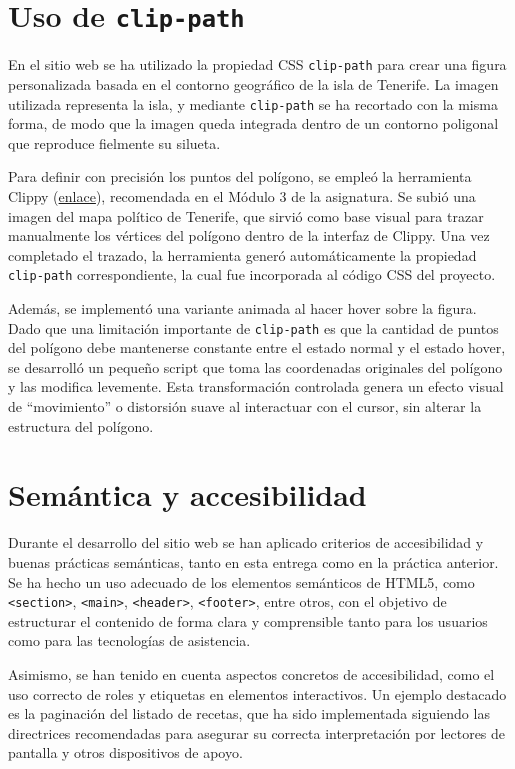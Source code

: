 \documentclass{article}
\begin{document}
\section{Uso de \texttt{clip-path}}\label{sec:uso-de-clip-path}

En el sitio web se ha utilizado la propiedad CSS \texttt{clip-path} para crear una figura personalizada basada en el contorno geográfico de la isla de Tenerife. La imagen utilizada representa la isla, y mediante \texttt{clip-path} se ha recortado con la misma forma, de modo que la imagen queda integrada dentro de un contorno poligonal que reproduce fielmente su silueta.

Para definir con precisión los puntos del polígono, se empleó la herramienta Clippy (\href{https://bennettfeely.com/clippy/}{enlace}), recomendada en el Módulo 3 de la asignatura. Se subió una imagen del mapa político de Tenerife, que sirvió como base visual para trazar manualmente los vértices del polígono dentro de la interfaz de Clippy. Una vez completado el trazado, la herramienta generó automáticamente la propiedad \texttt{clip-path} correspondiente, la cual fue incorporada al código CSS del proyecto.

Además, se implementó una variante animada al hacer hover sobre la figura. Dado que una limitación importante de \texttt{clip-path} es que la cantidad de puntos del polígono debe mantenerse constante entre el estado normal y el estado hover, se desarrolló un pequeño script que toma las coordenadas originales del polígono y las modifica levemente. Esta transformación controlada genera un efecto visual de ``movimiento'' o distorsión suave al interactuar con el cursor, sin alterar la estructura del polígono.

\section{Semántica y accesibilidad}\label{sec:semantica-y-accesibilidad}

Durante el desarrollo del sitio web se han aplicado criterios de accesibilidad y buenas prácticas semánticas, tanto en esta entrega como en la práctica anterior. Se ha hecho un uso adecuado de los elementos semánticos de HTML5, como \texttt{<section>}, \texttt{<main>}, \texttt{<header>}, \texttt{<footer>}, entre otros, con el objetivo de estructurar el contenido de forma clara y comprensible tanto para los usuarios como para las tecnologías de asistencia.

Asimismo, se han tenido en cuenta aspectos concretos de accesibilidad, como el uso correcto de roles y etiquetas en elementos interactivos. Un ejemplo destacado es la paginación del listado de recetas, que ha sido implementada siguiendo las directrices recomendadas para asegurar su correcta interpretación por lectores de pantalla y otros dispositivos de apoyo.
\end{document}
